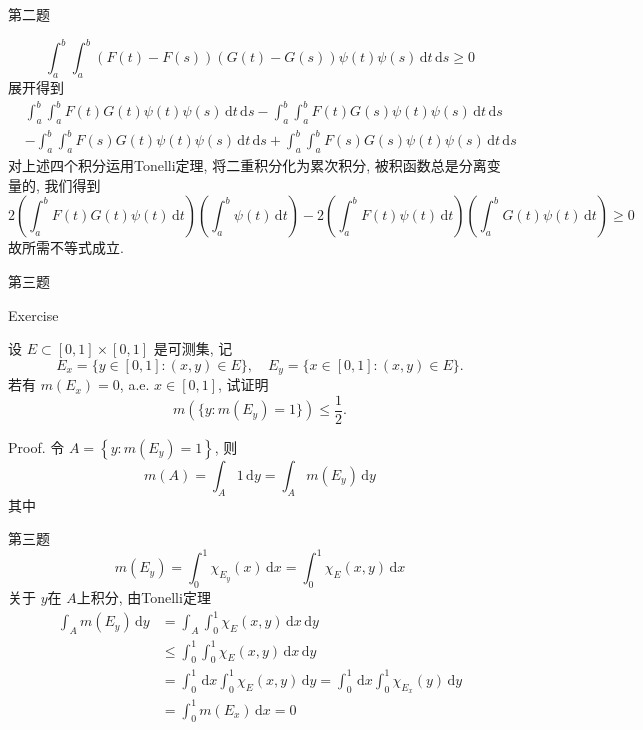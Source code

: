 \documentclass{beamer}
\begin{document}
\begin{frame}[fragile]{第二题}

\[
  \int_{a}^{b}\int_{a}^{b}\left( F\left( t \right)-F\left( s \right)   \right)\left( G\left( t \right)-G\left( s \right)   \right)\psi \left( t \right)\psi \left( s \right) \,\mathrm{d} t\,\mathrm{d} s   \ge 0
  \]展开得到 \[
\begin{aligned}
&  \int_{a}^{b}\int_{a}^{b}F\left( t \right)G\left( t \right)\psi \left( t \right)\psi \left( s \right)\,\mathrm{d} t\,\mathrm{d} s-\int_{a}^{b}\int_{a}^{b}F\left( t \right)G\left( s \right)\psi \left( t \right)\psi \left( s \right)\,\mathrm{d} t\,\mathrm{d} s   \\ 
 &-\int_{a}^{b}\int_{a}^{b}F\left( s \right)G\left( t \right)\psi \left( t \right)\psi \left( s \right)\,\mathrm{d} t\,\mathrm{d} s+ \int_{a}^{b}\int_{a}^{b}F\left( s \right)G\left( s \right)\psi \left( t \right)\psi \left( s \right)\,\mathrm{d} t\,\mathrm{d} s         
\end{aligned}       
  \]对上述四个积分运用Tonelli定理, 将二重积分化为累次积分, 被积函数总是分离变量的, 我们得到 \[
  2\left( \int_{a}^{b} F\left( t \right)G\left( t \right)\psi \left( t \right)\,\mathrm{d} t   \right)\left( \int_{a}^{b}\psi \left( t \right)\,\mathrm{d} t  \right)-2\left( \int_{a}^{b}F\left( t \right)\psi \left( t \right)\,\mathrm{d} t   \right)\left( \int_{a}^{b}G\left( t \right)\psi \left( t \right)\,\mathrm{d} t   \right)    \ge 0
  \]故所需不等式成立.
\end{frame}
\begin{frame}[fragile]{第三题}
\begin{block}{Exercise}

设 \(E\subset[0,1]\times[0,1]\) 是可测集, 记
\[
E_x=\{y\in[0,1]:(x,y)\in E\},\quad
E_y=\{x\in[0,1]:(x,y)\in E\}.
\]
若有 \(m(E_x)=0\), a.e. \(x\in[0,1]\), 试证明
\[
m(\{y:m(E_y)=1\})\le\frac12.
\]
\end{block}

Proof. 
 令 \(  A= \left\{ y: m\left( E_{y} \right)= 1  \right\}  \), 则 \[
 m\left( A \right)= \int_{A}1\,\mathrm{d} y=   \int_{A}m\left( E_{y} \right)\,\mathrm{d} y
  \] 其中 
\end{frame}


\begin{frame}[fragile]{第三题}
 \[
  m\left( E_{y} \right)= \int_{0}^{1}\chi _{E_{y}}\left( x \right)\,\mathrm{d} x= \int_{0}^{1}\chi _{E}\left( x,y \right)\,\mathrm{d} x   
  \]关于 \(  y  \)在 \(  A  \)上积分, 由Tonelli定理 \[
  \begin{aligned}
  \int_{A}m\left( E_{y} \right)\,\mathrm{d} y&= \int_{A}\int_{0}^{1}\chi _{E}\left( x,y \right)\,\mathrm{d} x\,\mathrm{d} y \\ 
   & \le \int_{0}^{1}\int_{0}^{1}\chi _{E}\left( x,y \right)\,\mathrm{d} x\,\mathrm{d} y  \\ 
    &= \int_{0}^{1}\,\mathrm{d} x\int_{0}^{1}\chi _{E}\left( x,y \right)\,\mathrm{d} y= \int_{0}^{1}\,\mathrm{d} x \int_{0}^{1}\chi _{E_{x}}\left( y \right)\,\mathrm{d} y\\ 
     &= \int_{0}^{1}m\left( E_{x} \right)\,\mathrm{d} x= 0  
  \end{aligned}
  \]
\end{frame}
\end{document}
